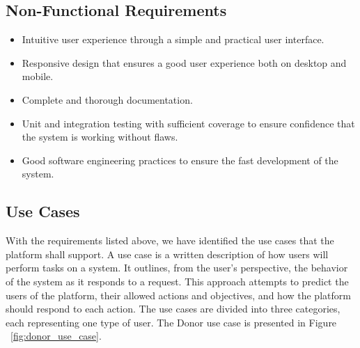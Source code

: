 \subsection{Non-Functional Requirements}
\begin{itemize}
	\item Intuitive user experience through a simple and practical user interface.
	
	\item Responsive design that ensures a good user experience both on desktop and mobile.
	
	\item Complete and thorough documentation.
	
	\item Unit and integration testing with sufficient coverage to ensure confidence that the system is working without flaws.
	
	\item Good software engineering practices to ensure the fast development of the system.
\end{itemize}
\newpage

\subsection{Use Cases}\label{sec:use_cases}
With the requirements listed above, we have identified the use cases that the platform
shall support. A use case is a written description of how users will perform tasks on
a system. It outlines, from the user's perspective, the behavior of the system as it
responds to a request. This approach attempts to predict the users of the platform, their allowed actions and objectives, and how the platform should respond to each action.
The use cases are divided into three categories, each representing one type of user.
The Donor use case is presented in Figure ~\ref{fig:donor_use_case}.

